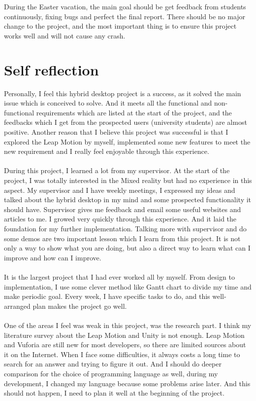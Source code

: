 \\
\\
During the Easter vacation, the main goal should be get feedback from students continuously, fixing bugs and perfect the final report. There should be no major change to the project, and the most important thing is to ensure this project works well and will not cause any crash.

\section{Self reflection}
Personally, I feel this hybrid desktop project is a success, as it solved the main issue which is conceived to solve. And it meets all the functional and non-functional requirements which are listed at the start of the project, and the feedbacks which I get from the prospected users (university students) are almost positive. Another reason that I believe this project was successful is that I explored the Leap Motion by myself, implemented some new features to meet the new requirement and I really feel enjoyable through this experience.
\\
\\
During this project, I learned a lot from my supervisor. At the start of the project, I was totally interested in the Mixed reality but had no experience in this aspect. My supervisor and I have weekly meetings, I expressed my ideas and talked about the hybrid desktop in my mind and some prospected functionality it should have. Supervisor gives me feedback and email some useful websites and articles to me. I growed very quickly through this experience. And it laid the foundation for my further implementation. Talking more with supervisor and do some demos are two important lesson which I learn from this project. It is not only a way to show what you are doing, but also a direct way to learn what can I improve and how can I improve.
\\
\\
It is the largest project that I had ever worked all by myself. From design to implementation, I use some clever method like Gantt chart to divide my time and make periodic goal. Every week, I have specific tasks to do, and this well-arranged plan makes the project go well.
\\
\\
One of the areas I feel was weak in this project, was the research part. I think my literature survey about the Leap Motion and Unity is not enough. Leap Motion and Vuforia are still new for most developers, so there are limited sources about it on the Internet. When I face some difficulties, it always costs a long time to search for an answer and trying to figure it out. And I should do deeper comparison for the choice of programming language as well, during my development, I changed my language because some problems arise later. And this should not happen, I need to plan it well at the beginning of the project.
